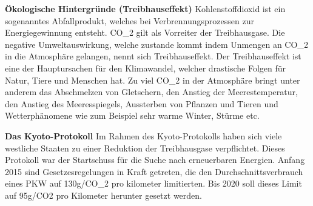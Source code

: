 \textbf{Ökologische Hintergründe (Treibhauseffekt)}
Kohlenstoffdioxid ist ein sogenanntes Abfallprodukt, welches bei Verbrennungsprozessen zur Energiegewinnung entsteht. 
CO_{2} gilt als Vorreiter der Treibhausgase.
Die negative Umweltauswirkung, welche zustande kommt indem Unmengen an CO_{2} in die Atmosphäre gelangen, 
nennt sich Treibhauseffekt. 
Der Treibhauseffekt ist eine der Hauptursachen für den Klimawandel, welcher drastische Folgen für Natur, Tiere und Menschen hat. 
Zu viel CO_{2} in der Atmosphäre bringt unter anderem das Abschmelzen von Gletschern, 
den Anstieg der Meerestemperatur, den Anstieg des Meeresspiegels, 
Aussterben von Pflanzen und Tieren und Wetterphänomene wie zum Beispiel sehr warme Winter, Stürme etc. 

\textbf{Das Kyoto-Protokoll}
Im Rahmen des Kyoto-Protokolls haben sich viele westliche Staaten zu einer Reduktion der Treibhausgase verpflichtet. 
Dieses Protokoll war der Startschuss für die Suche nach erneuerbaren Energien. 
Anfang 2015 sind Gesetzesregelungen in Kraft getreten, die den Durchschnittsverbrauch eines PKW auf 130g/CO_{2} pro kilometer limitierten. 
Bis 2020 soll dieses Limit auf 95g/CO2 pro Kilometer herunter gesetzt werden.



\clearpage %